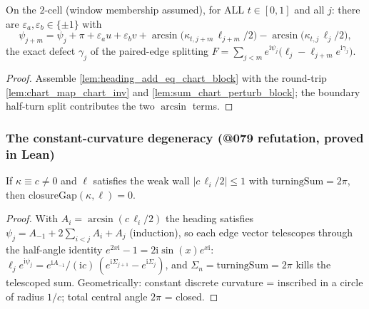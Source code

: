 \begin{lemma}
  \label{lem:heading_closing_cell_add_half}
  On the $2$-cell (window membership assumed), for ALL $t \in [0,1]$ and all
  $j$: there are $\varepsilon_a, \varepsilon_b \in \{\pm1\}$ with
  \[
    \psi_{j+m} = \psi_j + \pi + \varepsilon_a u + \varepsilon_b v
      + \arcsin\bigl(\kappa_{t,j+m}\,\ell_{j+m}/2\bigr)
      - \arcsin\bigl(\kappa_{t,j}\,\ell_j/2\bigr),
  \]
  the exact defect $\gamma_j$ of the paired-edge splitting
  $F = \sum_{j<m} e^{\mathrm{i}\psi_j}\bigl(\ell_j - \ell_{j+m}
  e^{\mathrm{i}\gamma_j}\bigr)$.
\end{lemma}
\begin{proof}

\leanok
  Assemble \cref{lem:heading_add_eq_chart_block} with the round-trip
  \cref{lem:chart_map_chart_inv} and \cref{lem:sum_chart_perturb_block}; the
  boundary half-turn split contributes the two $\arcsin$ terms.
\end{proof}

\subsubsection*{The constant-curvature degeneracy (@079 refutation, proved in Lean)}

\begin{lemma}
  \label{lem:closure_gap_eq_zero_of_const}
  If $\kappa \equiv c \ne 0$ and $\ell$ satisfies the weak wall
  $|c\,\ell_i/2| \le 1$ with $\mathrm{turningSum} = 2\pi$, then
  $\mathrm{closureGap}(\kappa, \ell) = 0$.
\end{lemma}
\begin{proof}

\leanok
  With $A_i = \arcsin(c\,\ell_i/2)$ the heading satisfies $\psi_j = A_{-1} +
  2\sum_{i<j} A_i + A_j$ (induction), so each edge vector telescopes through
  the half-angle identity $e^{2x\mathrm{i}} - 1 = 2\mathrm{i}\sin(x)e^{x\mathrm{i}}$:
  $\ell_j e^{\mathrm{i}\psi_j} = e^{\mathrm{i}A_{-1}}/(\mathrm{i}c)\,
  (e^{\mathrm{i}\Sigma_{j+1}} - e^{\mathrm{i}\Sigma_j})$, and $\Sigma_n =
  \mathrm{turningSum} = 2\pi$ kills the telescoped sum. Geometrically: constant
  discrete curvature = inscribed in a circle of radius $1/c$; total central
  angle $2\pi$ = closed.
\end{proof}

